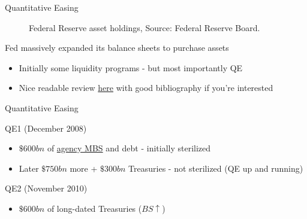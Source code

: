 \begin{frame}{Quantitative Easing}

\begin{figure}
\begin{center}


\end{center}
\caption{Federal Reserve asset holdings, Source: Federal Reserve Board.}
\end{figure}

Fed massively expanded its balance sheets to purchase assets
\begin{itemize}
\item	Initially some liquidity programs - but most importantly QE
\item	Nice readable review \href{https://www.frbsf.org/economic-research/publications/economic-letter/2018/december/review-of-unconventional-monetary-policy/}{here} with good bibliography if you're interested
\end{itemize}

\end{frame}


	
\begin{frame}{Quantitative Easing}

QE1 (December 2008)
	\begin{itemize}
	\item	$\$600bn$ of \href{https://www.investopedia.com/terms/a/agency-mbs-purchase.asp}{agency MBS} and debt - initially sterilized
	\item	Later $\$750bn$ more + $\$300bn$ Treasuries - not sterilized (QE up and running)
	\end{itemize}
\vspace{3mm}
QE2 (November 2010)
	\begin{itemize}
	\item	$\$600bn$ of long-dated Treasuries ($BS\uparrow$)
	\end{itemize}

\end{frame}

